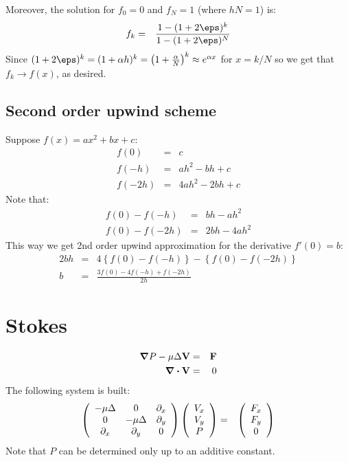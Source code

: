 Moreover, the solution for $f_0 = 0$ and $f_N = 1$ (where $h N = 1$) is:
\begin{eqnarray}
f_k &=& \frac{1 - (1+2\eps)^k}{1 - (1+2\eps)^N}
\end{eqnarray}
Since $(1+2\eps)^k = (1+\alpha h)^k = \left(1 + \frac{\alpha}{N}\right)^k \approx e^{\alpha x}$ for $x = k/N$
so we get that $f_k \rightarrow f(x)$, as desired.
\subsection{Second order upwind scheme}
Suppose $f(x) = ax^2 + bx + c$:
\begin{eqnarray}
  f(0) &=& c \\
  f(-h) &=& ah^2 - bh + c \\
  f(-2h) &=& 4ah^2 - 2bh + c
\end{eqnarray}
Note that:
\begin{eqnarray}
  f(0) - f(-h) &=& bh - ah^2 \\
  f(0) - f(-2h) &=& 2bh - 4ah^2
\end{eqnarray}
This way we get 2nd order upwind approximation for the derivative $f'(0) = b$:
\begin{eqnarray}
  2bh &=& 4\left\{f(0) - f(-h)\right\} - \left\{f(0) - f(-2h)\right\} \\
  b &=& \frac{3f(0) - 4f(-h) + f(-2h)}{2h}
\end{eqnarray}

\section{Stokes}
\begin{eqnarray}
 \bnabla P - \mu \Delta \mathbf{V} &=& \mathbf{F} \\
 \bnabla \bcdot \mathbf{V} &=& 0
\end{eqnarray}
The following system is built:
\begin{eqnarray}
 \mat{ccc}{-\mu\Delta & 0 & \partial_x \\ 0 & -\mu\Delta & \partial_y \\ \partial_x & \partial_y & 0}
 \mat{c}{V_x \\ V_y \\ P} &=& \mat{c}{F_x \\ F_y \\ 0}
\end{eqnarray}
Note that $P$ can be determined only up to an additive constant.
